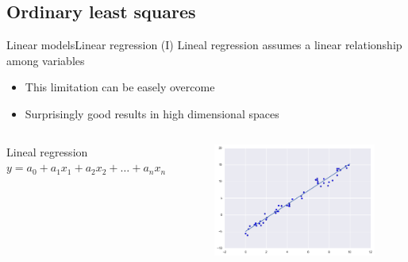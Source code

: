 \documentclass[10pt,compress]{beamer} %
\begin{document}
\subsection{Ordinary least squares}
\begin{frame}{Linear models}{Linear regression (I)}
     Lineal regression assumes a linear relationship among variables
	\begin{itemize}
		\item This limitation can be easely overcome
		\item Surprisingly good results in high dimensional spaces
	\end{itemize}

    \begin{columns}
        \begin{block}{Lineal regression}
            $y = a_0 + a_1 x_1  + a_2 x_2 + \dots + a_n x_n$
        \end{block}

		\begin{figure}
	        \includegraphics[width=\textwidth]{figs/regression.png}
		\end{figure}
    \end{columns}

\end{frame}

\end{document}
